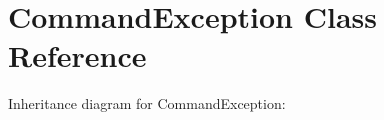 \hypertarget{class_command_exception}{}\section{Command\+Exception Class Reference}
\label{class_command_exception}


Inheritance diagram for Command\+Exception\+:
